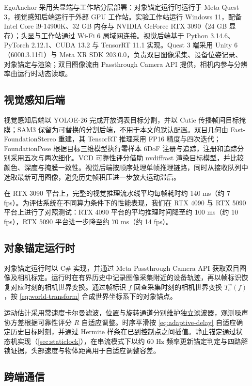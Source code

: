 \documentclass[9pt,twocolumn,letterpaper]{extarticle}
\begin{document}
EgoAnchor 采用头显端与工作站分层部署：对象锚定运行时运行于 Meta Quest 3，视觉感知后端运行于外部 GPU 工作站。实验工作站运行 Windows 11，配备 Intel Core i9-14900K、32 GB 内存与 NVIDIA GeForce RTX 3090（24 GB 显存）；头显与工作站通过 Wi-Fi 6 局域网连接。视觉后端基于 Python 3.14.6、PyTorch 2.12.1、CUDA 13.2 与 TensorRT 11.1 实现。Quest 3 端采用 Unity 6（6000.3.11f1）与 Meta XR SDK 203.0.0，负责双目图像采集、设备位姿记录、对象锚定与渲染；双目图像流由 Passthrough Camera API 提供，相机内参与分辨率由运行时动态读取。

\subsection{视觉感知后端}


视觉感知后端以 YOLOE-26 完成开放词表目标分割，并以 Cutie 传播帧间目标掩膜；SAM3 保留为可替换的分割后端，不用于本文的默认配置。双目几何由 Fast-FoundationStereo 重建，其 TensorRT 推理采用 FP16 精度与四次迭代；FoundationPose 根据目标三维模型执行零样本 6DoF 注册与追踪，注册和追踪分别采用五次与两次细化。VCD 可靠性评分借助 nvdiffrast 渲染目标模型，并比较颜色、深度与掩膜一致性。视觉后端按顺序处理单帧推理链路，同时从接收队列中选取最新可用图像，避免历史帧积压进一步放大运动滞后。

在 RTX 3090 平台上，完整的视觉推理流水线平均每帧耗时约 140 ms（约 7 fps）。为评估系统在不同算力条件下的性能表现，我们在 RTX 4090 与 RTX 5090 平台上进行了对照测试：RTX 4090 平台的平均推理时间降至约 100 ms（约 10 fps），RTX 5090 平台进一步降至约 70 ms（约 14 fps）。

\subsection{对象锚定运行时}


对象锚定运行时以 C\# 实现，并通过 Meta Passthrough Camera API 获取双目图像及相机标定。运行时在有界历史中记录图像采集附近的设备轨迹，再以帧标识恢复对应时刻的相机世界变换。通过帧标识 $f$ 回查采集时刻的相机世界变换 $T_c^w (f)$，按 \ref{eq:world-transform} 合成世界坐标系下的对象锚点。

运动估计采用常速度卡尔曼滤波，位置与旋转通道分别维护独立滤波器，观测噪声协方差根据可靠性评分 $R$ 自适应调整。时序平滑按 \ref{eq:adaptive-delay} 自适应确定历史目标时刻，并通过 Hermite 样条在已到控制点之间插值。静止锚定通过状态机实现（\ref{sec:staticlock}），在串流模式下以约 60 Hz 频率更新锚定判定与四路解锁证据，头部速度与物体距离用于自适应调整容差。

\subsection{跨端通信}
\end{document}
